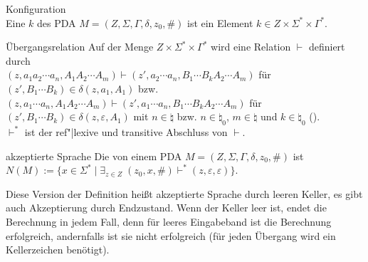 \linie

\begin{Def}{Konfiguration}\\
    Eine  $k$ des PDA
    $M = (Z, \Sigma, \Gamma, \delta, z_0, \#)$
    ist ein Element $k \in Z \times \Sigma^\ast \times \Gamma^\ast$.
\end{Def}

\begin{Def}{Übergangsrelation}
    Auf der Menge $Z \times \Sigma^\ast \times \Gamma^\ast$ wird eine
    Relation $\vdash$ definiert durch\\
    $(z, a_1 a_2 \dotsb a_n, A_1 A_2 \dotsb A_m) \vdash
    (z', a_2 \dotsb a_n, B_1 \dotsb B_k A_2 \dotsb A_m)$ für
    $(z', B_1 \dotsb B_k) \in \delta(z, a_1, A_1)$ bzw.\!
    $(z, a_1 \dotsb a_n, A_1 A_2 \dotsb A_m) \vdash
    (z', a_1 \dotsb a_n, B_1 \dotsb B_k A_2 \dotsb A_m)$ für
    $(z', B_1 \dotsb B_k) \in \delta(z, \varepsilon, A_1)$
    mit $n \in \natural$ bzw. $n \in \natural_0$,
    $m \in \natural$ und $k \in \natural_0$ ().\\
    $\vdash^\ast$ ist der ref"|lexive und transitive Abschluss von $\vdash$.
\end{Def}

\begin{Def}{akzeptierte Sprache}
    Die von einem PDA $M = (Z, \Sigma, \Gamma, \delta, z_0, \#)$
     ist
    $N(M) := \{x \in \Sigma^\ast \;|\;
    \exists_{z \in Z}\; (z_0, x, \#) \vdash^\ast
    (z, \varepsilon, \varepsilon)\}$.
\end{Def}

\begin{Bem}
    Diese Version der Definition heißt akzeptierte Sprache durch leeren Keller,
    es gibt auch Akzeptierung durch Endzustand.
    Wenn der Keller leer ist, endet die Berechnung in jedem Fall, denn für
    leeres Eingabeband ist die Berechnung erfolgreich, andernfalls ist sie
    nicht erfolgreich (für jeden Übergang wird ein Kellerzeichen benötigt).
\end{Bem}

\linie
\pagebreak

